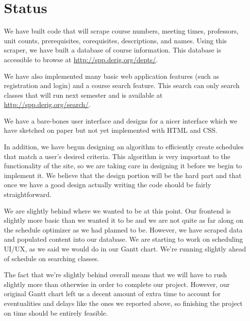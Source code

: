 \section{Status}
We have built code that will scrape course numbers, meeting times,
professors, unit counts, prerequisites, corequisites, descriptions, and names.
Using this scraper, we have built a database of course information. This database
is accessible to browse at \url{http://spp.derig.org/depts/}.

We have also implemented many basic web application features (such as
registration and login) and a course search feature. This search can only
search classes that will run next semester and is available at
\url{http://spp.derig.org/search/}.

We have a bare-bones user interface and designs for a nicer interface which we
have sketched on paper but not yet implemented with HTML and CSS.

In addition, we have begun designing an algorithm to efficiently create schedules
that match a user's desired criteria. This algorithm is very important to the
functionality of the site, so we are taking care in designing it before we begin
to implement it. We believe that the design portion will be the hard part and
that once we have a good design actually writing the code should be fairly
straightforward.

We are slightly behind where we wanted to be at this point. Our
frontend is slightly more basic than we wanted it to be and we
are not quite as far along on the schedule optimizer as we had planned to be.
However, we have scraped data and populated content into our database. We are
starting to work on scheduling UI/UX, as we said we would do in our Gantt chart.
We're running slightly ahead of schedule on searching classes.

The fact that we're slightly behind overall means that we will have to rush
slightly more than otherwise in order to complete our project. However, our
original Gantt chart left us a decent amount of extra time to account for
eventualities and delays like the ones we reported above, so finishing the
project on time should be entirely feasible.

